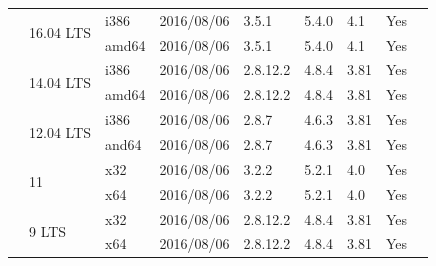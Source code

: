 \documentclass[11pt,twoside,openany,x11names,svgnames]{memoir}
\begin{document}
{\begin{longtable}{| >{\bfseries}p{3cm} | p{2cm} | p{1cm} | p{2cm} | p{1.2cm} | p{1cm} | p{1cm} | p{1cm} | p{1.5cm} |}
	\hline
	\hline
	
	\multirow{6}{*}{\texttt{Ubuntu Desktop}}      & \multirow{2}{*}{16.04 LTS}     & i386   & 2016/08/06  & 3.5.1    & 5.4.0 & 4.1   & Yes   &  \\
																		           \cline{3-8}
	                                              &                                & amd64  & 2016/08/06  & 3.5.1    & 5.4.0 & 4.1   & Yes   &  \\
	                                              \cline{2-8}
	                                              & \multirow{2}{*}{14.04 LTS}     & i386   & 2016/08/06  & 2.8.12.2 & 4.8.4 & 3.81  & Yes   &  \\
	                                         							           \cline{3-8}
	                                              &                                & amd64  & 2016/08/06  & 2.8.12.2 & 4.8.4 & 3.81  & Yes   &  \\
	                                              \cline{2-8}
	                                              & \multirow{2}{*}{12.04 LTS}     & i386   & 2016/08/06  & 2.8.7    & 4.6.3 & 3.81  & Yes   &  \\
	                                         							           \cline{3-8}
	                                              &                                & and64  & 2016/08/06  & 2.8.7    & 4.6.3 & 3.81  & Yes   &  \\
	                                             
	\hline
	\hline
	
	\multirow{4}{*}{\texttt{Zorin OS Core}}       & \multirow{2}{*}{11}            & x32    & 2016/08/06  & 3.2.2    & 5.2.1 & 4.0   & Yes   &  \\
																		           \cline{3-8}
	                                              &                                & x64    & 2016/08/06  & 3.2.2    & 5.2.1 & 4.0   & Yes   &  \\
	                                              \cline{2-8}
	                                              & \multirow{2}{*}{9 LTS}         & x32    & 2016/08/06  & 2.8.12.2 & 4.8.4 & 3.81  & Yes   &  \\
	                                         	 						           \cline{3-8}
	                                              &                                & x64    & 2016/08/06  & 2.8.12.2 & 4.8.4 & 3.81  & Yes   &  \\
	\hline
	\hline
	                        

\end{longtable}}
\end{document}
